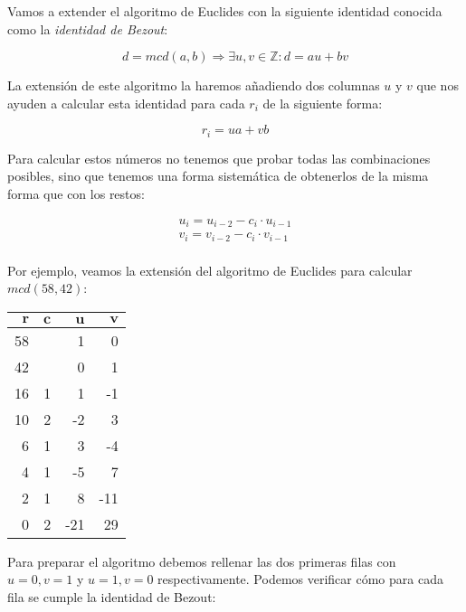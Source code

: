 Vamos a extender el algoritmo de Euclides con la siguiente identidad conocida como la \textit{identidad de Bezout}:

\[d = mcd(a,b) \Rightarrow \exists u,v \in\mathbb{Z} : d = au + bv\]

La extensión de este algoritmo la haremos añadiendo dos columnas $u$ y $v$ que nos ayuden a calcular esta identidad para cada $r_i$ de la siguiente forma:

\[r_i = ua + vb\]

Para calcular estos números no tenemos que probar todas las combinaciones posibles, sino que tenemos una forma sistemática de obtenerlos de la misma forma que con los restos:

\begin{align*}
	u_i = u_{i-2} - c_i \cdot u_{i-1} \\
	v_i = v_{i-2} - c_i \cdot v_{i-1} \\
\end{align*}

Por ejemplo, veamos la extensión del algoritmo de Euclides para calcular $mcd(58,42)$:

\begin{center}
\begin{tabular}{r r r r}
  $\boldsymbol{r}$ & $\boldsymbol{c}$ & $\boldsymbol{u}$ & $\boldsymbol{v}$ \\
	\toprule
   58              &                  & 1                & 0                \\
   42              &                  & 0                & 1                \\
   16              & 1                & 1                & -1               \\
   10              & 2                & -2               & 3                \\
   6               & 1                & 3                & -4               \\
   4               & 1                & -5               & 7                \\
   2               & 1                & 8                & -11              \\
	0               & 2                & -21              & 29               \\
\end{tabular}
\end{center}

Para preparar el algoritmo debemos rellenar las dos primeras filas con $u=0, v=1$ y $u=1, v=0$ respectivamente.
Podemos verificar cómo para cada fila se cumple la identidad de Bezout:

